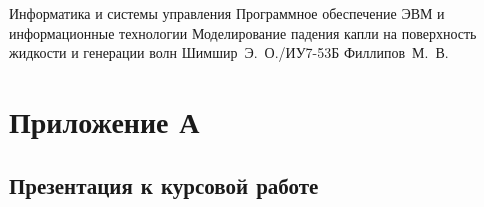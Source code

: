\documentclass{bmstu}
\begin{document}
\renewcommand{\thelstlisting}{\arabic{lstlisting}}

\makecourseworktitle
    {Информатика и системы управления}
    {Программное обеспечение ЭВМ и информационные технологии}
    {Моделирование падения капли на поверхность жидкости и генерации волн}
    {Шимшир~Э.~О./ИУ7-53Б}
    {Филлипов~М.~В.}
    {}

\maketableofcontents

 
 
 
 





\makebibliography

\chapter*{Приложение А}
\section*{Презентация к курсовой работе}
\end{document}
